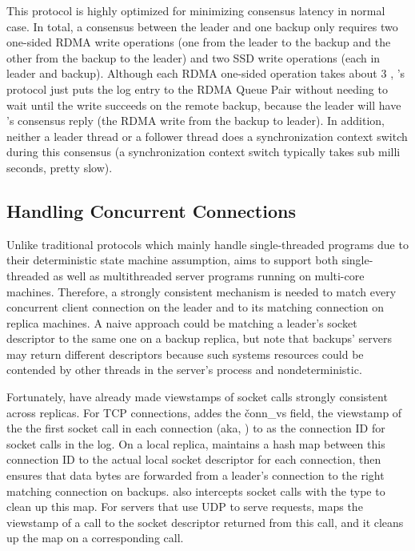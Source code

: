 This protocol is highly optimized for minimizing consensus latency in normal 
case. In total, a consensus between the leader and one backup only requires 
two one-sided RDMA write operations (one from the leader to the backup and the 
other from the backup to the leader) and two SSD write operations (each in 
leader and backup). Although each RDMA one-sided operation takes about 3 \us, 
\xxx's protocol just puts the log entry to the RDMA Queue Pair without needing 
to wait until the write succeeds on the remote backup, because the leader will 
have \paxos's consensus reply (the RDMA write from the backup to leader). In 
addition, neither a leader thread or a follower thread does a synchronization 
context switch during this consensus (a synchronization context switch 
typically takes sub milli seconds, pretty slow).



\subsection{Handling Concurrent Connections} \label{sec:concurrent}

Unlike traditional \paxos protocols which mainly handle single-threaded 
programs due to their deterministic state machine assumption, \xxx aims to 
support both single-threaded as well as multithreaded server programs running 
on multi-core machines. Therefore, a strongly consistent mechanism is needed to 
match every concurrent client connection on the leader and to its matching 
connection on replica machines. A naive approach could be matching a leader's 
socket descriptor to the same one on a backup replica, but note that backups' 
servers may return different descriptors because such systems resources could 
be contended by other threads in the server's process and nondeterministic.

Fortunately, \paxos have already made viewstamps of socket calls strongly 
consistent across replicas. For TCP connections, \xxx addes the 
\v{conn\_vs} field, the viewstamp of the the first socket call in each 
connection (aka, \accept) to as the connection ID for socket calls in the 
log. On a local replica, \xxx maintains a hash map between this connection ID 
to the actual local socket descriptor for each connection, then \xxx ensures 
that data bytes are forwarded from a leader's connection to the right matching 
connection on backups. \xxx also intercepts socket calls with the \close type 
to clean up this map. For servers that use UDP to serve requests, \xxx maps the 
viewstamp of a \recvfrom call to the socket descriptor returned from this call, 
and it cleans up the map on a corresponding \sendto call. 

